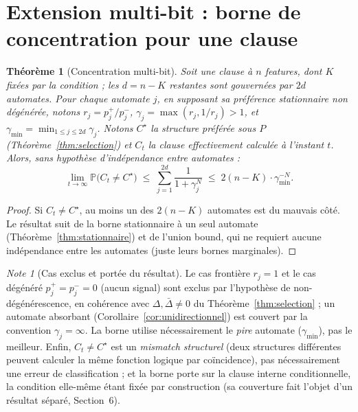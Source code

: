 \documentclass[12pt,a4paper]{article}
\newtheorem{theorem}{Théorème}[section]
\theoremstyle{remark}
\newtheorem{note}{Note}[section]
\begin{document}
\section{Extension multi-bit : borne de concentration pour une clause}

\begin{theorem}[Concentration multi-bit]\label{thm:multibit}
Soit une clause à $n$ features, dont $K$ fixées par la condition ; les $d=n-K$
restantes sont gouvernées par $2d$ automates. Pour chaque automate $j$, en
supposant sa préférence stationnaire non dégénérée, notons
$r_j=p_j^+/p_j^-$, $\gamma_j=\max(r_j,1/r_j)>1$, et
$\gamma_{\min}=\min_{1\le j\le 2d}\gamma_j$. Notons $C^\star$ la structure
préférée sous $P$ (Théorème~\ref{thm:selection}) et $C_t$ la clause
effectivement calculée à l'instant $t$. Alors, sans hypothèse d'indépendance
entre automates :
\[
  \boxed{\lim_{t\to\infty}\mathbb P\bigl(C_t\ne C^\star\bigr)
  \;\le\; \sum_{j=1}^{2d} \frac1{1+\gamma_j^N}
  \;\le\; 2(n-K)\cdot\gamma_{\min}^{-N}.}
\]
\end{theorem}

\begin{proof}
Si $C_t\ne C^\star$, au moins un des $2(n-K)$ automates est du mauvais côté.
Le résultat suit de la borne stationnaire à un seul automate
(Théorème~\ref{thm:stationnaire}) et de l'union bound, qui ne requiert aucune
indépendance entre les automates (juste leurs bornes marginales).
\end{proof}

\begin{note}[Cas exclus et portée du résultat]
Le cas frontière $r_j=1$ et le cas dégénéré $p_j^+=p_j^-=0$ (aucun signal) sont
exclus par l'hypothèse de non-dégénérescence, en cohérence avec
$\Delta,\bar\Delta\ne0$ du Théorème~\ref{thm:selection} ; un automate absorbant
(Corollaire~\ref{cor:unidirectionnel}) est couvert par la convention
$\gamma_j=\infty$. La borne utilise nécessairement le \emph{pire} automate
($\gamma_{\min}$), pas le meilleur. Enfin, $C_t\ne C^\star$ est un
\emph{mismatch structurel} (deux structures différentes peuvent calculer la
même fonction logique par coïncidence), pas nécessairement une erreur de
classification ; et la borne porte sur la clause interne conditionnelle, la
condition elle-même étant fixée par construction (sa couverture fait l'objet d'un
résultat séparé, Section~6).
\end{note}
\end{document}
